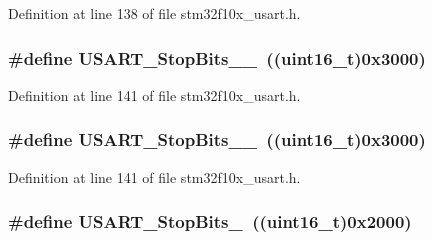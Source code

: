 Definition at line 138 of file stm32f10x\+\_\+usart.\+h.

\subsubsection[{\texorpdfstring{U\+S\+A\+R\+T\+\_\+\+Stop\+Bits\+\_\+1\+\_\+5}{USART_StopBits_1_5}}]{\setlength{\rightskip}{0pt plus 5cm}\#define U\+S\+A\+R\+T\+\_\+\+Stop\+Bits\+\_\+\_~(({\bf uint16\+\_\+t})0x3000)}\hypertarget{group___u_s_a_r_t___stop___bits_ga30897cc46d5b3790a9b14ffaba354527}{}\label{group___u_s_a_r_t___stop___bits_ga30897cc46d5b3790a9b14ffaba354527}


Definition at line 141 of file stm32f10x\+\_\+usart.\+h.

\subsubsection[{\texorpdfstring{U\+S\+A\+R\+T\+\_\+\+Stop\+Bits\+\_\+1\+\_\+5}{USART_StopBits_1_5}}]{\setlength{\rightskip}{0pt plus 5cm}\#define U\+S\+A\+R\+T\+\_\+\+Stop\+Bits\+\_\+\_~(({\bf uint16\+\_\+t})0x3000)}\hypertarget{group___u_s_a_r_t___stop___bits_ga30897cc46d5b3790a9b14ffaba354527}{}\label{group___u_s_a_r_t___stop___bits_ga30897cc46d5b3790a9b14ffaba354527}


Definition at line 141 of file stm32f10x\+\_\+usart.\+h.

\subsubsection[{\texorpdfstring{U\+S\+A\+R\+T\+\_\+\+Stop\+Bits\+\_\+2}{USART_StopBits_2}}]{\setlength{\rightskip}{0pt plus 5cm}\#define U\+S\+A\+R\+T\+\_\+\+Stop\+Bits\+\_~(({\bf uint16\+\_\+t})0x2000)}\hypertarget{group___u_s_a_r_t___stop___bits_ga652058b6be2f48ac0d82d0e75537fc81}{}\label{group___u_s_a_r_t___stop___bits_ga652058b6be2f48ac0d82d0e75537fc81}


